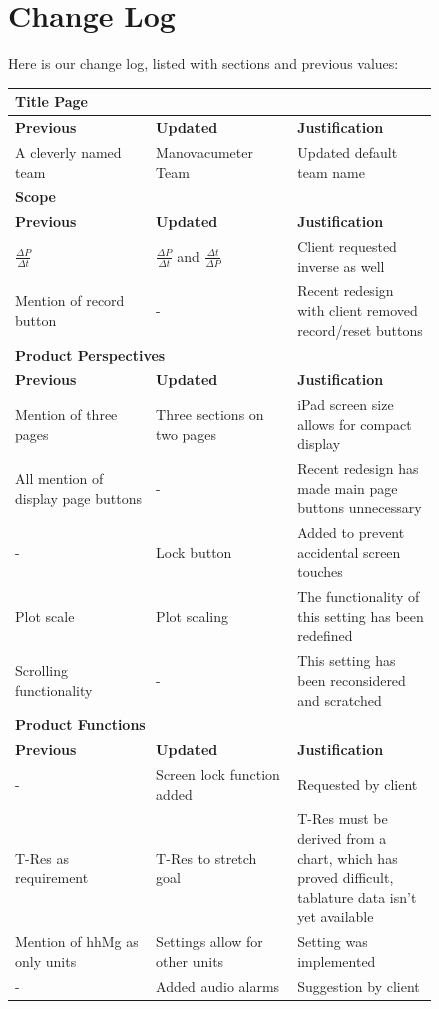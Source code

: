 \documentclass[onecolumn, draftclsnofoot,10pt, compsoc]{IEEEtran}
\begin{document}
\section{Change Log}
Here is our change log, listed with sections and previous values:
\begin{longtable}[h]{| p{0.28\linewidth} | p{0.28\linewidth} | p{0.28\linewidth} |}

		\multicolumn{3}{l}{\textbf{Title Page}} \\ \hline
		\textbf{Previous} & \textbf{Updated} & \textbf{Justification} \\
		\hline
		A cleverly named team & Manovacumeter Team & Updated default team name \\
		\hline

		\multicolumn{3}{l}{\textbf{Scope}} \\ \hline
		\textbf{Previous} & \textbf{Updated} & \textbf{Justification} \\
		\hline
		$\frac{\Delta P}{\Delta t}$ & $\frac{\Delta P}{\Delta t}$ and $\frac{\Delta t}{\Delta P}$ & Client requested inverse as well \\
		\hline
		Mention of record button & - & Recent redesign with client removed record/reset buttons \\
		\hline

		\multicolumn{3}{l}{\textbf{Product Perspectives}} \\ \hline
		\textbf{Previous} & \textbf{Updated} & \textbf{Justification} \\ \hline
		Mention of three pages & Three sections on two pages & iPad screen size allows for compact display  \\
		\hline
		All mention of display page buttons & - & Recent redesign has made main page buttons unnecessary \\
		\hline
		- & Lock button & Added to prevent accidental screen touches \\
		\hline
		Plot scale & Plot scaling & The functionality of this setting has been redefined \\
		\hline
		Scrolling functionality & - & This setting has been reconsidered and scratched \\
		\hline

		\multicolumn{3}{l}{\textbf{Product Functions}} \\ \hline
		\textbf{Previous} & \textbf{Updated} & \textbf{Justification} \\ \hline
		- & Screen lock function added & Requested by client \\
		\hline
		T-Res as requirement & T-Res to stretch goal & T-Res must be derived from a chart, which has proved difficult, tablature data isn't yet available \\
		\hline
		Mention of hhMg as only units & Settings allow for other units & Setting was implemented \\
		\hline
		- & Added audio alarms & Suggestion by client \\
		\hline


\end{longtable}
\end{document}
